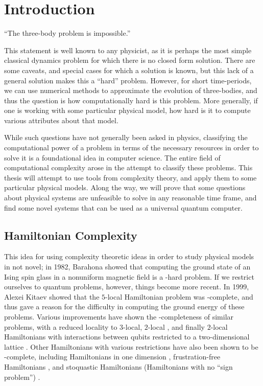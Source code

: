 \documentclass[../thesis-main/thesis-main]{subfiles}
\begin{document}
\chapter{Introduction}
\label{chap:introduction}

``The three-body problem is impossible.''

This statement is well known to any physicist, as it is perhaps the most simple classical dynamics problem for which there is no closed form solution.  There are some caveats, and special cases for which a solution is known, but this lack of a general solution makes this a ``hard'' problem.  However, for short time-periods, we can use numerical methods to approximate the evolution of three-bodies, and thus the question is how computationally hard is this problem.  More generally, if one is working with some particular physical model, how hard is it to compute various attributes about that model.

While such questions have not generally been asked in physics, classifying the computational power of a problem in terms of the necessary resources in order to solve it is a foundational idea in computer science.  The entire field of computational complexity arose in the attempt to classify these problems.  This thesis will attempt to use tools from complexity theory, and apply them to some particular physical models.  Along the way, we will prove that some questions about physical systems are unfeasible to solve in any reasonable time frame, and find some novel systems that can be used as a universal quantum computer.

\section{Hamiltonian Complexity}

This idea for using complexity theoretic ideas in order to study physical models in not novel; in 1982, Barahona \cite{Bar82} showed that computing the ground state of an Ising spin glass in a nonuniform magnetic field is a \NP-hard problem.  If we restrict ourselves to quantum problems, however, things become more recent. In 1999, Alexei Kitaev \cite{KSV02} showed that the $5$-local Hamiltonian problem was \QMA-complete, and thus gave a reason for the difficulty in computing the ground energy of these problems.  Various improvements have shown the \QMA-completeness of similar problems, with a reduced locality to $3$-local\cite{KR03}, $2$-local \cite{KKR04}, and finally $2$-local Hamiltonians with interactions between qubits restricted to a two-dimensional lattice \cite{OT05}.  Other Hamiltonians with various restrictions have also been shown to be \QMA-complete, including Hamiltonians in one dimension \cite{AGIK09,GI09}, frustration-free Hamiltonians \cite{Bra06,GN13}, and stoquastic Hamiltonians (Hamiltonians with no ``sign problem'') \cite{BDOT08,BT09}.
\end{document}
